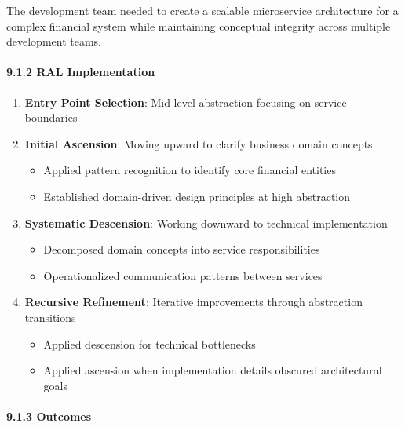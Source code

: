 \documentclass[
]{article}
\providecommand{\tightlist}{%
  \setlength{\itemsep}{0pt}\setlength{\parskip}{0pt}}
\begin{document}
The development team needed to create a scalable microservice
architecture for a complex financial system while maintaining conceptual
integrity across multiple development teams.

\paragraph{9.1.2 RAL Implementation}\label{ral-implementation}

\begin{enumerate}
\def\labelenumi{\arabic{enumi}.}
\tightlist
\item
  \textbf{Entry Point Selection}: Mid-level abstraction focusing on
  service boundaries
\item
  \textbf{Initial Ascension}: Moving upward to clarify business domain
  concepts

  \begin{itemize}
  \tightlist
  \item
    Applied pattern recognition to identify core financial entities
  \item
    Established domain-driven design principles at high abstraction
  \end{itemize}
\item
  \textbf{Systematic Descension}: Working downward to technical
  implementation

  \begin{itemize}
  \tightlist
  \item
    Decomposed domain concepts into service responsibilities
  \item
    Operationalized communication patterns between services
  \end{itemize}
\item
  \textbf{Recursive Refinement}: Iterative improvements through
  abstraction transitions

  \begin{itemize}
  \tightlist
  \item
    Applied descension for technical bottlenecks
  \item
    Applied ascension when implementation details obscured architectural
    goals
  \end{itemize}
\end{enumerate}

\paragraph{9.1.3 Outcomes}\label{outcomes}
\end{document}

